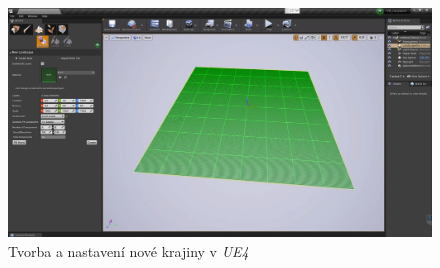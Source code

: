 \documentclass[a4paper, 12pt]{report}
\begin{document}
\begin{figure}[h!]
	\centering
	\includegraphics[width=16cm]{newLevel_settings.jpg}
	\caption{Tvorba a nastavení nové krajiny v \textit{UE4} }
\end{figure}
\end{document}
